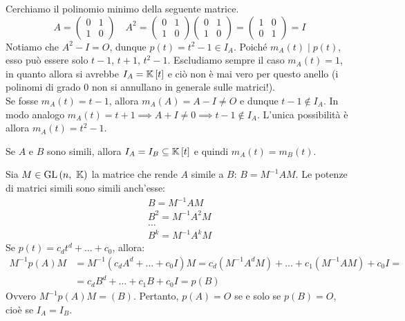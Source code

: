 \begin{example} Cerchiamo il polinomio minimo della seguente matrice.
	\begin{equation*}
		A=\left(\begin{array}{cc}
			0 & 1 \\
			1 & 0
		\end{array}\right)\quad A^2=\left(\begin{array}{cc}
		0 & 1 \\
		1 & 0
	\end{array}\right)\left(\begin{array}{cc}
	0 & 1 \\
	1 & 0
\end{array}\right)=\left(\begin{array}{cc}
1 & 0 \\
0 & 1
\end{array}\right)=I
	\end{equation*}
Notiamo che $A^2-I=O$, dunque $p\left(t\right)=t^2-1\in I_A$. Poiché $m_A\left(t\right)\mid p\left(t\right)$, esso può essere solo $t-1$, $t+1$, $t^2-1$. Escludiamo sempre il caso $m_A\left(t\right)=1$, in quanto allora si avrebbe $I_A=\mathbb{K}\left[t\right]$ e ciò non è mai vero per questo anello (i polinomi di grado $0$ non si annullano in generale sulle matrici!).\\
Se fosse $m_A\left(t\right)=t-1$, allora $m_A\left(A\right)=A-I\neq O$ e dunque $t-1\notin I_A$. In modo analogo $m_A\left(t\right)=t+1\implies A+I\neq 0\implies t-1\notin I_A$. L'unica possibilità è allora $m_A\left(t\right)=t^2-1$.
\end{example}
\begin{observe}
	Se $A$ e $B$ sono simili, allora $I_A=I_B\subseteq \mathbb{K}\left[t\right]$ e quindi $m_A\left(t\right)=m_B\left(t\right)$.
\end{observe}
\begin{demonstration}
	Sia $M\in\operatorname{GL}\left(n,\ \mathbb{K}\right)$ la matrice che rende $A$ simile a $B$: $B=M^{-1}AM$. Le potenze di matrici simili sono simili anch'esse:
	\begin{equation*}
		\begin{array}{l}
			B=M^{-1}AM\\
			B^2=M^{-1}A^2M\\
			\ldots\\
			B^k=M^{-1}A^kM
		\end{array}
	\end{equation*}
Se $p\left(t\right)=c_dt^d+\ldots+c_0$, allora:
\begin{equation*}
	\begin{array}{ll}
		M^{-1}p\left(A\right)M&=M^{-1}\left(c_dA^d+\ldots+c_0I\right)M=c_d\left(M^{-1}A^dM\right)+\ldots+c_1\left(M^{-1}AM\right)+c_0I=\\
		&=c_dB^d+\ldots+c_1B+c_0I=p\left(B\right)
	\end{array}
\end{equation*}
Ovvero $M^{-1}p\left(A\right)M=\left(B\right)$. Pertanto, $p\left(A\right)=O$ se e solo se $p\left(B\right)=O$, cioè se $I_A=I_B$.
\end{demonstration}
